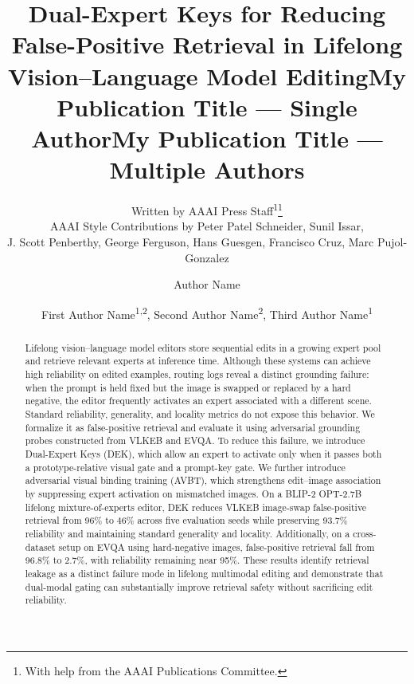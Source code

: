 \documentclass[letterpaper]{article} %
\title{Dual-Expert Keys for Reducing False-Positive Retrieval in Lifelong Vision–Language Model Editing}
\author{
    Written by AAAI Press Staff\textsuperscript{\rm 1}\thanks{With help from the AAAI Publications Committee.}\\
    AAAI Style Contributions by Peter Patel Schneider,
    Sunil Issar,\\
    J. Scott Penberthy,
    George Ferguson,
    Hans Guesgen,
    Francisco Cruz\equalcontrib\corresponding,
    Marc Pujol-Gonzalez\equalcontrib\corresponding
}
\title{My Publication Title --- Single Author}
\author {
    Author Name
}
\title{My Publication Title --- Multiple Authors}
\author {
    First Author Name\textsuperscript{\rm 1,\rm 2}\equalcontrib,
    Second Author Name\textsuperscript{\rm 2}\equalcontrib,
    Third Author Name\textsuperscript{\rm 1}\corresponding
}
\begin{document}
\maketitle


\begin{abstract}
    Lifelong vision–language model editors store sequential edits in a growing expert pool and retrieve relevant experts at inference time. Although these systems can achieve high reliability on edited examples, routing logs reveal a distinct grounding failure: when the prompt is held fixed but the image is swapped or replaced by a hard negative, the editor frequently activates an expert associated with a different scene. Standard reliability, generality, and locality metrics do not expose this behavior. We formalize it as false-positive retrieval and evaluate it using adversarial grounding probes constructed from VLKEB and EVQA. To reduce this failure, we introduce Dual-Expert Keys (DEK), which allow an expert to activate only when it passes both a prototype-relative visual gate and a prompt-key gate. We further introduce adversarial visual binding training (AVBT), which strengthens edit–image association by suppressing expert activation on mismatched images. On a BLIP-2 OPT-2.7B lifelong mixture-of-experts editor, DEK reduces VLKEB image-swap false-positive retrieval from 96\% to 46\% across five evaluation seeds while preserving 93.7\% reliability and maintaining standard generality and locality. Additionally, on a cross-dataset setup on EVQA using hard-negative images, false-positive retrieval fall from 96.8\% to 2.7\%, with reliability remaining near 95\%. These results identify retrieval leakage as a distinct failure mode in lifelong multimodal editing and demonstrate that dual-modal gating can substantially improve retrieval safety without sacrificing edit reliability.
\end{abstract}
\end{document}
